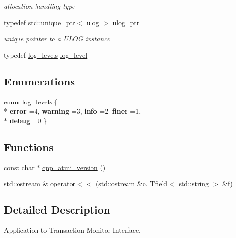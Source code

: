 \begin{DoxyCompactItemize}
\begin{DoxyCompactList}\small\item\em allocation handling type \end{DoxyCompactList}\item 
\hypertarget{group__logging_gaa0869c7a6b1f7846685e2454b70b9e7a}{typedef std\+::unique\+\_\+ptr$<$ \hyperlink{classatmi_1_1ulog}{ulog} $>$ \hyperlink{group__logging_gaa0869c7a6b1f7846685e2454b70b9e7a}{ulog\+\_\+ptr}}\label{group__logging_gaa0869c7a6b1f7846685e2454b70b9e7a}

\begin{DoxyCompactList}\small\item\em unique pointer to a U\+L\+O\+G instance \end{DoxyCompactList}\item 
typedef \hyperlink{group__logging_gaf9bdc466e66896621125b81d022264ca}{log\+\_\+levels} \hyperlink{group__logging_ga74d2cbe55d42a8a309e5535678fd9db3}{log\+\_\+level}
\end{DoxyCompactItemize}
\subsection*{Enumerations}
\begin{DoxyCompactItemize}
\item 
enum \hyperlink{group__logging_gaf9bdc466e66896621125b81d022264ca}{log\+\_\+levels} \{ \\*
{\bfseries error} =4, 
{\bfseries warning} =3, 
{\bfseries info} =2, 
{\bfseries finer} =1, 
\\*
{\bfseries debug} =0
 \}
\end{DoxyCompactItemize}
\subsection*{Functions}
\begin{DoxyCompactItemize}
\item 
const char $\ast$ \hyperlink{group__fml_ga1db5d7cd1f711e43cd63dedbd9e3f8d1}{cpp\+\_\+atmi\+\_\+version} ()
\item 
std\+::ostream \& \hyperlink{group__fml_gaf0b4f377c31559db649c37f8df6f9c13}{operator$<$$<$} (std\+::ostream \&o, \hyperlink{classatmi_1_1_tfield}{Tfield}$<$ std\+::string $>$ \&f)
\end{DoxyCompactItemize}


\subsection{Detailed Description}
Application to Transaction Monitor Interface. 
